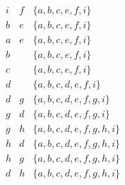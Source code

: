 \begin{naloga}
\begin{odgovor}
\begin{tabela}
$$\begin{array}{c|c|c}
i & f & \{a, b, c, e, f, i\} \\
b & e & \{a, b, c, e, f, i\} \\
a & e & \{a, b, c, e, f, i\} \\
b & & \{a, b, c, e, f, i\} \\
c & & \{a, b, c, e, f, i\} \\
d & & \{a, b, c, d, e, f, i\} \\
d & g &\{a, b, c, d, e, f, g, i\} \\
g & d & \{a, b, c, d, e, f, g, i\} \\
g & h & \{a, b, c, d, e, f, g, h, i\} \\
h & d & \{a, b, c, d, e, f, g, h, i\} \\
h & g & \{a, b, c, d, e, f, g, h, i\} \\
d & h & \{a, b, c, d, e, f, g, h, i\} \\
\end{array}
$$
\end{tabela}

\begin{slika}
\pgfslika
{}
\end{slika}

\end{odgovor}
\end{naloga}
